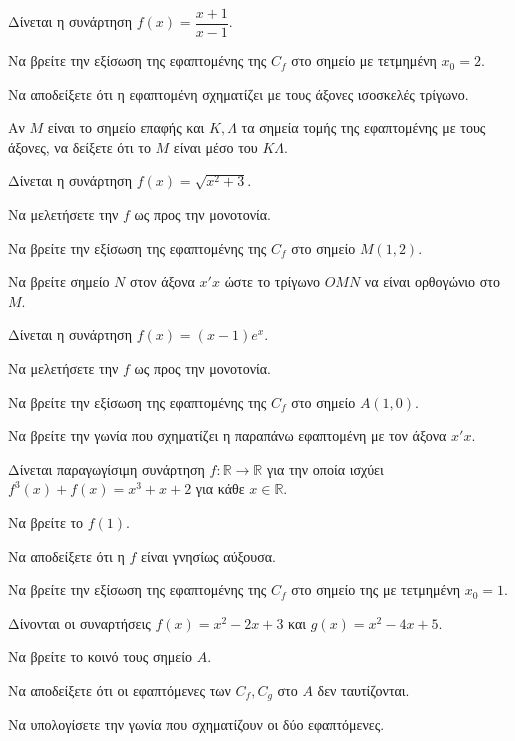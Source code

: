 \documentclass[11pt,a4paper,modern]{FFExercises}
\begin{document}
\askhsh
Δίνεται η συνάρτηση $ f(x)=\dfrac{x+1}{x-1} $.
\begin{alist}
    \item Να βρείτε την εξίσωση της εφαπτομένης της $C_f$ στο σημείο με τετμημένη $ x_0=2 $.
    \item Να αποδείξετε ότι η εφαπτομένη σχηματίζει με τους άξονες ισοσκελές τρίγωνο.
    \item Αν $ M $ είναι το σημείο επαφής και $ K, \Lambda $ τα σημεία τομής της εφαπτομένης με τους άξονες, να δείξετε ότι το $ M $ είναι μέσο του $ K\Lambda $.
\end{alist}

\askhsh
Δίνεται η συνάρτηση $ f(x)=\sqrt{x^2+3} $.
\begin{alist}
    \item Να μελετήσετε την $ f $ ως προς την μονοτονία.
    \item Να βρείτε την εξίσωση της εφαπτομένης της $ C_f $ στο σημείο $ M(1,2) $.
    \item Να βρείτε σημείο $ N $ στον άξονα $ x'x $ ώστε το τρίγωνο $ OMN $ να είναι ορθογώνιο στο $ M $.
\end{alist}

\askhsh
Δίνεται η συνάρτηση $ f(x)=(x-1)e^x $.
\begin{alist}
    \item Να μελετήσετε την $ f $ ως προς την μονοτονία.
    \item Να βρείτε την εξίσωση της εφαπτομένης της $ C_f $ στο σημείο $ A(1,0) $.
    \item Να βρείτε την γωνία που σχηματίζει η παραπάνω εφαπτομένη με τον άξονα $ x'x $.
\end{alist}

\askhsh
Δίνεται παραγωγίσιμη συνάρτηση $ f:\mathbb{R}\to\mathbb{R} $ για την οποία ισχύει $ f^3(x)+f(x)=x^3+x+2 $ για κάθε $ x\in\mathbb{R} $.
\begin{alist}
    \item Να βρείτε το $ f(1) $.
    \item Να αποδείξετε ότι η $ f $ είναι γνησίως αύξουσα.
    \item Να βρείτε την εξίσωση της εφαπτομένης της $ C_f $ στο σημείο της με τετμημένη $ x_0=1 $.
\end{alist}
\askhsh
Δίνονται οι συναρτήσεις $ f(x)=x^2-2x+3 $ και $ g(x)=x^2-4x+5 $.
\begin{alist}
    \item Να βρείτε το κοινό τους σημείο $ A $.
    \item Να αποδείξετε ότι οι εφαπτόμενες των $ C_f, C_g $ στο $ A $ δεν ταυτίζονται.
    \item Να υπολογίσετε την γωνία που σχηματίζουν οι δύο εφαπτόμενες.
\end{alist}
\end{document}
